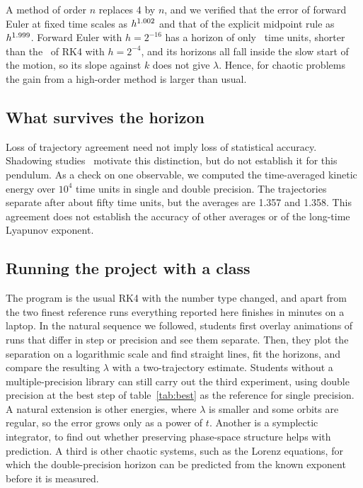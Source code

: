 \documentclass[12pt,a4paper]{article}
\begin{document}
A method of order $n$ replaces 4 by $n$, and we verified that the error of
forward Euler at fixed time scales as $h^{1.002}$ and that of the explicit
midpoint rule as $h^{1.999}$. Forward Euler with $h=2^{-16}$ has a horizon of
only \TEulerFine\ time units, shorter than the \TRKcoarse\ of RK4 with
$h=2^{-4}$, and its horizons all fall inside the slow start of the motion, so
its slope against $k$ does not give $\lambda$. Hence, for chaotic problems the
gain from a high-order method is larger than usual.

\subsection{What survives the horizon}

Loss of trajectory agreement need not imply loss of statistical accuracy.
Shadowing studies~\cite{hammel1987,hammel1988,grebogi1990,sauer1997,hayes2004}
motivate this distinction, but do not establish it for this pendulum. As a
check on one observable, we computed the time-averaged kinetic energy over
$10^4$ time units in single and double precision. The trajectories separate
after about fifty time units, but the averages are 1.357 and 1.358. This
agreement does not establish the accuracy of other averages or of the
long-time Lyapunov exponent.

\subsection{Running the project with a class}

The program is the usual RK4 with the number type changed, and apart from the
two finest reference runs everything reported here finishes in minutes on a
laptop. In the natural sequence we followed, students first overlay animations
of runs that differ in step or precision and see them separate. Then, they plot
the separation on a logarithmic scale and find straight lines, fit the
horizons, and compare the resulting $\lambda$ with a two-trajectory estimate.
Students without a multiple-precision library can still carry out the third
experiment, using double precision at the best step of table~\ref{tab:best} as
the reference for single precision. A natural extension is other energies,
where $\lambda$ is smaller and some orbits are regular, so the error grows only
as a power of $t$. Another is a symplectic integrator, to find out whether
preserving phase-space structure helps with prediction. A third is other
chaotic systems, such as the Lorenz equations, for which the double-precision
horizon can be predicted from the known exponent before it is measured.
\end{document}
